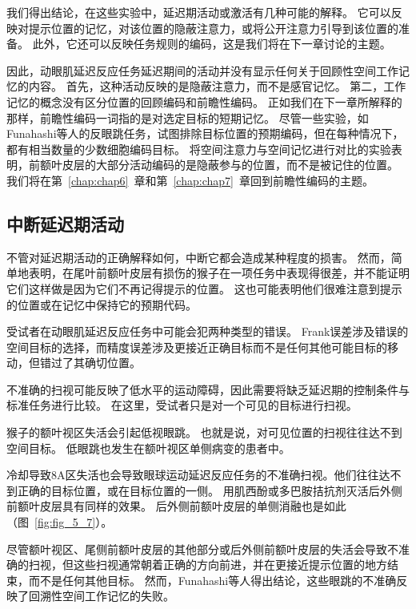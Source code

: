 我们得出结论，在这些实验中，延迟期活动或激活有几种可能的解释。
它可以反映对提示位置的记忆，对该位置的隐蔽注意力，或将公开注意力引导到该位置的准备。
此外，它还可以反映任务规则的编码，这是我们将在下一章讨论的主题。


因此，动眼肌延迟反应任务延迟期间的活动并没有显示任何关于回顾性空间工作记忆的内容。
首先，这种活动反映的是隐蔽注意力，而不是感官记忆。
第二，工作记忆的概念没有区分位置的回顾编码和前瞻性编码。
正如我们在下一章所解释的那样，前瞻性编码一词指的是对选定目标的短期记忆。
尽管一些实验，如Funahashi等人的反眼跳任务，试图排除目标位置的预期编码，但在每种情况下，都有相当数量的少数细胞编码目标。
将空间注意力与空间记忆进行对比的实验表明，前额叶皮层的大部分活动编码的是隐蔽参与的位置，而不是被记住的位置。
我们将在第~\ref{chap:chap6}~章和第~\ref{chap:chap7}~章回到前瞻性编码的主题。



\subsection{中断延迟期活动}

不管对延迟期活动的正确解释如何，中断它都会造成某种程度的损害。
然而，简单地表明，在尾叶前额叶皮层有损伤的猴子在一项任务中表现得很差，并不能证明它们这样做是因为它们不再记得提示的位置。
这也可能表明他们很难注意到提示的位置或在记忆中保持它的预期代码。


受试者在动眼肌延迟反应任务中可能会犯两种类型的错误。
Frank误差涉及错误的空间目标的选择\cite{keller2008effect}，而精度误差涉及更接近正确目标而不是任何其他可能目标的移动，但错过了其确切位置。


不准确的扫视可能反映了低水平的运动障碍，因此需要将缺乏延迟期的控制条件与标准任务进行比较。
在这里，受试者只是对一个可见的目标进行扫视。


猴子的额叶视区失活会引起低视眼跳。
也就是说，对可见位置的扫视往往达不到空间目标\cite{dias1999muscimol}。
低眼跳也发生在额叶视区单侧病变的患者中\cite{gaymard1999frontal,ploner1999errors}。


冷却导致8A区失活也会导致眼球运动延迟反应任务的不准确扫视。他们往往达不到正确的目标位置，或在目标位置的一侧\cite{chafee2000inactivation}。
用肌西酚\cite{sawaguchi2001prefrontal}或多巴胺拮抗剂\cite{sawaguchi1991d1}灭活后外侧前额叶皮层具有同样的效果。
后外侧前额叶皮层的单侧消融也是如此\cite{funahashi1993dorsolateral}（图~\ref{fig:fig_5_7}）。


尽管额叶视区、尾侧前额叶皮层的其他部分或后外侧前额叶皮层的失活会导致不准确的扫视，但这些扫视通常朝着正确的方向前进，并在更接近提示位置的地方结束，而不是任何其他目标。
然而，Funahashi等人\cite{funahashi1993dorsolateral}得出结论，这些眼跳的不准确反映了回溯性空间工作记忆的失败。



